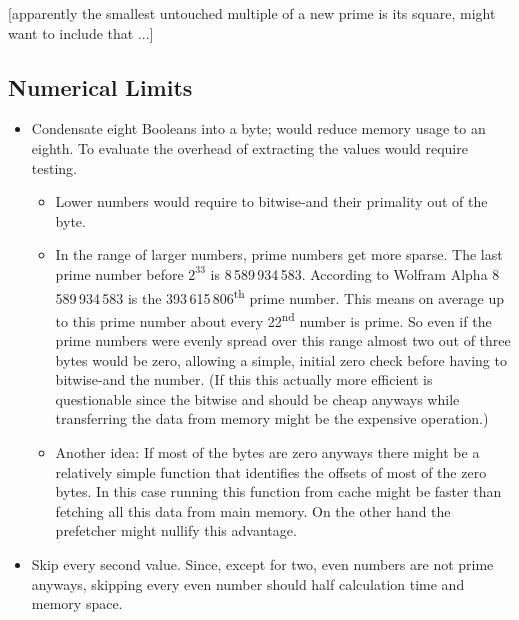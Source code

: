 \documentclass[a4paper,10pt]{article}
\begin{document}
[apparently the smallest untouched multiple of a new prime is its square, might want to include that ...]


\subsection{Numerical Limits}

\begin{itemize}
 \item Condensate eight Booleans into a byte; would reduce memory usage to an eighth. To evaluate the overhead of extracting the values would require testing.
 \begin{itemize}
  \item Lower numbers would require to bitwise-and their primality out of the byte.
  \item In the range of larger numbers, prime numbers get more sparse.
  The last prime number before $2^{33}$ is 8\,589\,934\,583.
  According to Wolfram Alpha 8\,589\,934\,583 is the 393\,615\,806\textsuperscript{th} prime number.
  This means on average up to this prime number about every 22\textsuperscript{nd} number is prime.
  So even if the prime numbers were evenly spread over this range almost two out of three bytes would be zero,
  allowing a simple, initial zero check before having to bitwise-and the number.
  (If this this actually more efficient is questionable since the bitwise and should be cheap anyways
  while transferring the data from memory might be the expensive operation.)
  \item Another idea:
  If most of the bytes are zero anyways there might be a relatively simple function that identifies the offsets of most of the zero bytes.
  In this case running this function from cache might be faster than fetching all this data from main memory.
  On the other hand the prefetcher might nullify this advantage.
 \end{itemize}
 \item Skip every second value.
 Since, except for two, even numbers are not prime anyways,
 skipping every even number should half calculation time and memory space.

\end{itemize}


\end{document}
